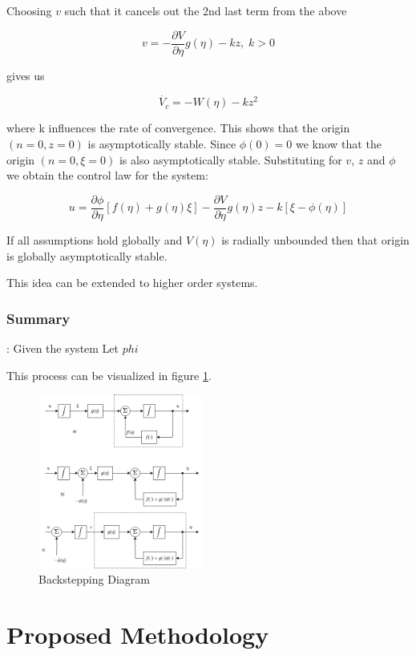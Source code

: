 Choosing $v$ such that it cancels out the 2nd last term from the above

$$ v = -\frac{\partial V}{\partial \eta}g(\eta) - kz, \; k > 0 $$

gives us

$$ \dot{V_c} = -W(\eta) - kz^2 $$

where k influences the rate of convergence.
This shows that the origin $(n=0, z=0)$ is asymptotically stable. Since $\phi(0) = 0$ we know that the origin $(n=0, \xi=0)$ is also asymptotically stable. Substituting for $v$, $z$ and $\phi$ we obtain the control law for the system:

\begin{equation}
    u =  \frac{\partial \phi}{\partial \eta} [f(\eta) + g(\eta)\xi] - \frac{\partial V}{\partial \eta}g(\eta)z - k[\xi - \phi(\eta)]
\end{equation}

If all assumptions hold globally and $V(\eta)$ is radially unbounded then that origin is globally asymptotically stable.
\par
This idea can be extended to higher order systems.
\subsubsection{Summary}:
    Given the system Let $phi$

\par
This process can be visualized in figure \ref{fig:backstepping}.

\begin{figure}
    \centering
    \includegraphics[width=0.48\textwidth]{Y1-report/Backstepping_diagram.drawio.png}
    \caption{Backstepping Diagram}
    \label{fig:backstepping}
\end{figure}

\section{Proposed Methodology}

